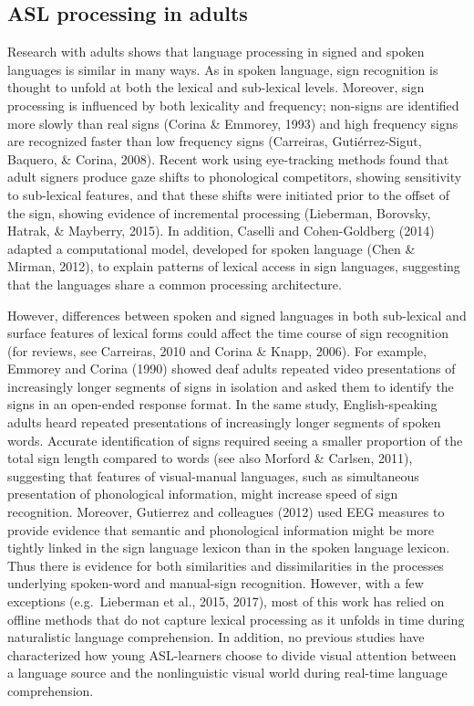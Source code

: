 \documentclass[oneside]{report}
\begin{document}
\hypertarget{asl-processing-in-adults}{%
\subsection{ASL processing in adults}\label{asl-processing-in-adults}}

Research with adults shows that language processing in signed and spoken
languages is similar in many ways. As in spoken language, sign
recognition is thought to unfold at both the lexical and sub-lexical
levels. Moreover, sign processing is influenced by both lexicality and
frequency; non-signs are identified more slowly than real signs (Corina
\& Emmorey, 1993) and high frequency signs are recognized faster than
low frequency signs (Carreiras, Gutiérrez-Sigut, Baquero, \& Corina,
2008). Recent work using eye-tracking methods found that adult signers
produce gaze shifts to phonological competitors, showing sensitivity to
sub-lexical features, and that these shifts were initiated prior to the
offset of the sign, showing evidence of incremental processing
(Lieberman, Borovsky, Hatrak, \& Mayberry, 2015). In addition, Caselli
and Cohen-Goldberg (2014) adapted a computational model, developed for
spoken language (Chen \& Mirman, 2012), to explain patterns of lexical
access in sign languages, suggesting that the languages share a common
processing architecture.

However, differences between spoken and signed languages in both
sub-lexical and surface features of lexical forms could affect the time
course of sign recognition (for reviews, see Carreiras, 2010 and Corina
\& Knapp, 2006). For example, Emmorey and Corina (1990) showed deaf
adults repeated video presentations of increasingly longer segments of
signs in isolation and asked them to identify the signs in an open-ended
response format. In the same study, English-speaking adults heard
repeated presentations of increasingly longer segments of spoken words.
Accurate identification of signs required seeing a smaller proportion of
the total sign length compared to words (see also Morford \& Carlsen,
2011), suggesting that features of visual-manual languages, such as
simultaneous presentation of phonological information, might increase
speed of sign recognition. Moreover, Gutierrez and colleagues (2012)
used EEG measures to provide evidence that semantic and phonological
information might be more tightly linked in the sign language lexicon
than in the spoken language lexicon. Thus there is evidence for both
similarities and dissimilarities in the processes underlying spoken-word
and manual-sign recognition. However, with a few exceptions
(e.g.~Lieberman et al., 2015, 2017), most of this work has relied on
offline methods that do not capture lexical processing as it unfolds in
time during naturalistic language comprehension. In addition, no
previous studies have characterized how young ASL-learners choose to
divide visual attention between a language source and the nonlinguistic
visual world during real-time language comprehension.
\end{document}
